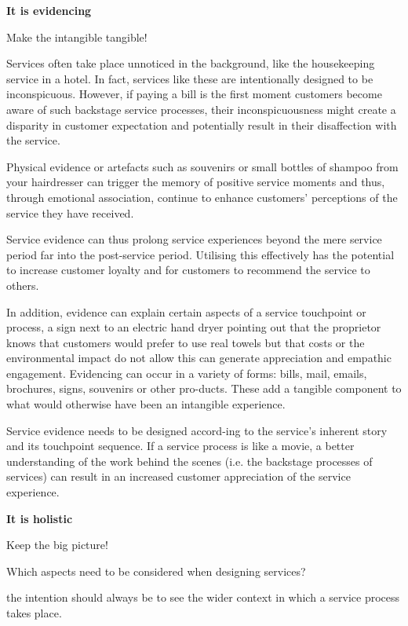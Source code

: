 \textbf{It is evidencing}


Make the intangible tangible!

Services often take place unnoticed in the background, like the housekeeping service in a hotel. In fact, services like these are intentionally designed to be inconspicuous. However, if paying a bill is the first moment customers become aware of such backstage service processes, their inconspicuousness might create a disparity in customer expectation and potentially result in their disaffection with the service.

Physical evidence or artefacts such as souvenirs or small bottles of shampoo from your hairdresser can trigger the memory of positive service moments and thus, through emotional association, continue to enhance customers’ perceptions of the service they have received.

Service evidence can thus prolong service experiences beyond the mere service period far into the post-service period. Utilising this effectively has the potential to increase customer loyalty and for customers to recommend the service to others. %

In addition, evidence can explain certain aspects of a service touchpoint or process, a sign next to an electric hand dryer pointing out that the proprietor knows that customers would prefer to use real towels but that costs or the environmental impact do not allow this can generate appreciation and empathic engagement. Evidencing can occur in a variety of forms: bills, mail, emails, brochures, signs, souvenirs or other pro-ducts. These add a tangible component to what would otherwise have been an intangible experience.

Service evidence needs to be designed accord-ing to the service’s inherent story and its touchpoint sequence. If a service process is like a movie, a better understanding of the work behind the scenes (i.e. the backstage processes of services) can result in an increased customer appreciation of the service experience.

\textbf{It is holistic}

Keep the big picture!

Which aspects need to be considered when designing services?

the intention should always be to see the wider context in which a service process takes place.

